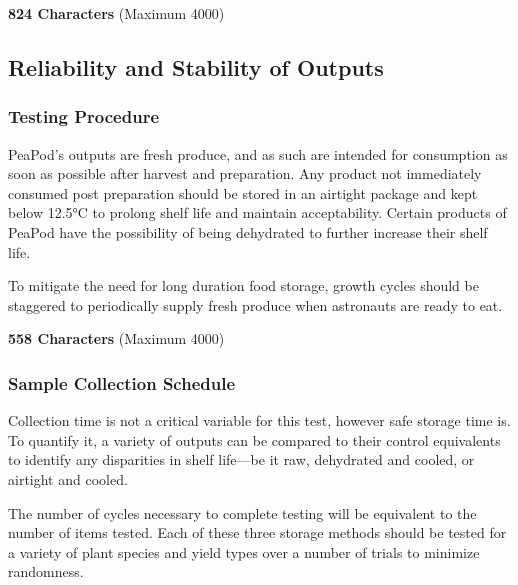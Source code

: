 \textbf{824 Characters} (Maximum 4000)

\clearpage

\subsection{Reliability and Stability of Outputs}


\subsubsection{Testing Procedure}

PeaPod's outputs are fresh produce, and as such are intended for consumption as soon as possible after harvest and preparation. Any product not immediately consumed post preparation should be stored in an airtight package and kept below 12.5°C to prolong shelf life and maintain acceptability. Certain products of PeaPod have the possibility of being dehydrated to further increase their shelf life.

To mitigate the need for long duration food storage, growth cycles should be staggered to periodically supply fresh produce when astronauts are ready to eat.

\textbf{558 Characters} (Maximum 4000)

\subsubsection{Sample Collection Schedule}

Collection time is not a critical variable for this test, however safe storage time is. To quantify it, a variety of outputs can be compared to their control equivalents to identify any disparities in shelf life---be it raw, dehydrated and cooled, or airtight and cooled.

The number of cycles necessary to complete testing will be equivalent to the number of items tested. Each of these three storage methods should be tested for a variety of plant species and yield types over a number of trials to minimize randomness.

